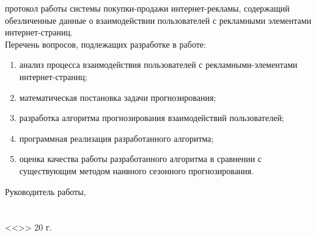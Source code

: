 протокол работы системы покупки-продажи интернет-рекламы, содержащий обезличенные данные о взаимодействии пользователей с
рекламными элементами интернет-страниц.\\
Перечень вопросов, подлежащих разработке в работе: 
\begin{enumerate}
    \item анализ процесса взаимодействия пользователей с рекламными-элементами интернет-страниц;
    \item математическая постановка задачи прогнозирования;
    \item разработка алгоритма прогнозирования взаимодействий пользователей;
    \item программная реализация разработанного алгоритма;
    \item оценка качества работы разработанного алгоритма в сравнении с существующим 
    методом наивного сезонного прогнозирования.
\end{enumerate}
\singlespacing{}
Руководитель работы,\\
\vspace{14pt}\\
\vspace{14pt}\\
<<\underline{\hspace{0.75cm}}>> \underline{\hspace{4.13cm}} 20\underline{\hspace{0.75cm}} г.